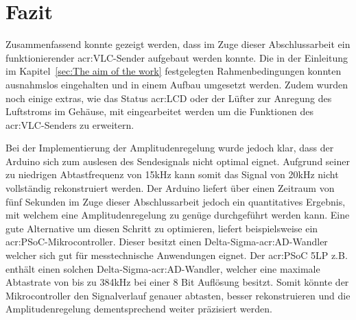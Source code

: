 
\chapter{Fazit}
\label{sec:conclusion_future-work}

Zusammenfassend konnte gezeigt werden, dass im Zuge dieser Abschlussarbeit ein funktionierender \gls{acr:VLC}-Sender aufgebaut werden konnte. Die in der Einleitung im Kapitel~\ref{sec:The aim of the work} festgelegten Rahmenbedingungen konnten ausnahmslos eingehalten und in einem Aufbau umgesetzt werden. Zudem wurden noch einige extras, wie das Status \gls{acr:LCD} oder der Lüfter zur Anregung des Luftstroms im Gehäuse, mit eingearbeitet werden um die Funktionen des \gls{acr:VLC}-Senders zu erweitern. 

Bei der Implementierung der Amplitudenregelung wurde jedoch klar, dass der Arduino sich zum auslesen des Sendesignals nicht optimal eignet. Aufgrund seiner zu niedrigen Abtastfrequenz von 15kHz kann somit das Signal von 20kHz nicht vollständig rekonstruiert werden. Der Arduino liefert über einen Zeitraum von fünf Sekunden im Zuge dieser Abschlussarbeit jedoch ein quantitatives Ergebnis, mit welchem eine Amplitudenregelung zu genüge durchgeführt werden kann. Eine gute Alternative um diesen Schritt zu optimieren, liefert beispielsweise ein \gls{acr:PSoC}-Mikrocontroller. Dieser besitzt einen Delta-Sigma-\gls{acr:AD}-Wandler welcher sich gut für messtechnische Anwendungen eignet. Der \gls{acr:PSoC} 5LP z.B. enthält einen solchen Delta-Sigma-\gls{acr:AD}-Wandler, welcher eine maximale Abtastrate von bis zu 384kHz bei einer 8 Bit Auflösung besitzt. Somit könnte der Mikrocontroller den Signalverlauf genauer abtasten, besser rekonstruieren und die Amplitudenregelung dementsprechend weiter präzisiert werden. 